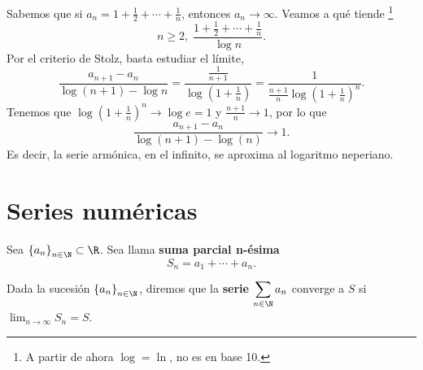 \begin{eg}
\normalfont Sabemos que si $\displaystyle a_{n} = 1 + \frac{1}{2} + \cdots + \frac{1}{n} $, entonces $\displaystyle a_{n} \to \infty $. Veamos a qué tiende \footnote{A partir de ahora $\displaystyle \log = \ln $, no es en base 10.} 
\[n\geq 2, \; \frac{1 + \frac{1}{2} + \cdots + \frac{1}{n}}{\log n} .\]
Por el criterio de Stolz, basta estudiar el límite, 
\[ \frac{a_{n+1}-a_{n}}{\log\left(n+1\right)-\log n} = \frac{\frac{1}{n+1}}{\log\left(1 + \frac{1}{n}\right)} = \frac{1}{\frac{n+1}{n}\log\left(1+\frac{1}{n}\right)^{n}} .\]
Tenemos que $\displaystyle \log\left(1 + \frac{1}{n}\right)^{n} \to \log e = 1 $ y $\displaystyle  \frac{n+1}{n} \to 1$, por lo que 
\[\frac{a_{n+1}-a_{n}}{\log\left(n+1\right)-\log\left(n\right)} \to 1 .\]
Es decir, la serie armónica, en el infinito, se aproxima al logaritmo neperiano.
\end{eg}

\section{Series numéricas}

\begin{fdefinition}
\normalfont Sea $\displaystyle \left\{ a_{n}\right\} _{n\in\N}\subset\R $. Sea llama \textbf{suma parcial n-ésima} 
\[S_{n} = a_{1} + \cdots + a_{n} .\]
\end{fdefinition}

\begin{fdefinition}[]
	\normalfont Dada la sucesión $\displaystyle \left\{ a_{n}\right\} _{n\in\N} $, diremos que la \textbf{serie} $\displaystyle \sum_{n\in\N}a_{n} $ converge a $\displaystyle S $ si $\displaystyle \lim_{n \to \infty}S_{n} = S $.
\end{fdefinition}

